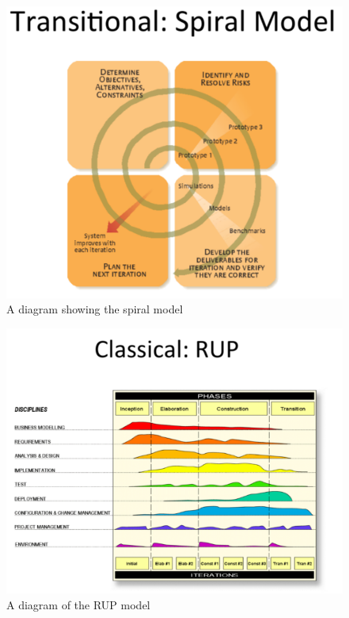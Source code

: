 \documentclass[a4paper]{article}
\begin{document}
\begin{figure}[H]
\begin{center} 
    \includegraphics[scale=0.3]{images/Spiral.pdf}
    \caption{A diagram showing the spiral model}
\end{center}
\end{figure}

\begin{figure}[H]
\begin{center} 
    \includegraphics[scale=0.3]{images/RUP.pdf}
    \caption{A diagram of the RUP model}
\end{center}
\end{figure}
\end{document}
